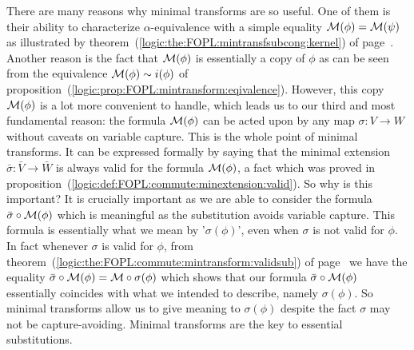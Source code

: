 There are many reasons why minimal transforms are so useful. One of
them is their ability to characterize $\alpha$-equivalence with a
simple equality ${\cal M}(\phi)={\cal M}(\psi)$ as illustrated by
theorem~(\ref{logic:the:FOPL:mintransfsubcong:kernel}) of
page~\pageref{logic:the:FOPL:mintransfsubcong:kernel}. Another
reason is the fact that ${\cal M}(\phi)$ is essentially a copy of
$\phi$ as can be seen from the equivalence ${\cal M}(\phi)\sim
i(\phi)$ of
proposition~(\ref{logic:prop:FOPL:mintransform:eqivalence}).
However, this copy ${\cal M}(\phi)$ is a lot more convenient to
handle, which leads us to our third and most fundamental reason: the
formula ${\cal M}(\phi)$ can be acted upon by any map $\sigma:V\to
W$ without caveats on variable capture. This is the whole point of
minimal transforms. It can be expressed formally by saying that the
minimal extension $\bar{\sigma}:\bar{V}\to\bar{W}$ is always valid
for the formula ${\cal M}(\phi)$, a fact which was proved in
proposition~(\ref{logic:def:FOPL:commute:minextension:valid}). So
why is this important? It is crucially important as we are able to
consider the formula $\bar{\sigma}\circ{\cal M}(\phi)$ which is
meaningful as the substitution avoids variable capture. This formula
is essentially what we mean by '$\sigma(\phi)$', even when $\sigma$
is not valid for $\phi$. In fact whenever $\sigma$ is valid for
$\phi$, from
theorem~(\ref{logic:the:FOPL:commute:mintransform:validsub}) of
page~\pageref{logic:the:FOPL:commute:mintransform:validsub} we have
the equality $\bar{\sigma}\circ{\cal M}(\phi)={\cal
M}\circ\sigma(\phi)$ which shows that our formula
$\bar{\sigma}\circ{\cal M}(\phi)$ essentially coincides with what we
intended to describe, namely $\sigma(\phi)$. So minimal transforms
allow us to give meaning to $\sigma(\phi)$ despite the fact $\sigma$
may not be capture-avoiding. Minimal transforms are the key to
essential substitutions.

